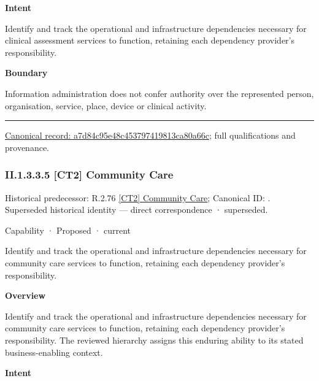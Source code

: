 \textbf{Intent}



Identify and track the operational and infrastructure dependencies necessary for clinical assessment services to function, retaining each dependency provider's responsibility.



\textbf{Boundary}



Information administration does not confer authority over the represented person, organisation, service, place, device or clinical activity.



\medskip\hrule\medskip

{\footnotesize \href{../../../../continuum/strategy/capability/a7d84c95e48c453797419813ca80a66c.md}{Canonical record: a7d84c95e48c453797419813ca80a66c}; full qualifications and provenance.}\par
\subsubsection*{II.1.3.3.5 [CT2] Community Care}
\label{navigation:II.1.3.3.5}

{\small Historical predecessor: R.2.76 \hyperref[element:4b7177f3f40449518fba381acae6ba1e]{[CT2] Community Care}; Canonical ID: \texttt{}. Superseded historical identity — direct correspondence · superseded.}\par
\label{element:942aa78cad004ef99de6b3aae8ddd014}
{\small Capability · Proposed · current}\par

Identify and track the operational and infrastructure dependencies necessary for community care services to function, retaining each dependency provider's responsibility.



\textbf{Overview}



Identify and track the operational and infrastructure dependencies necessary for community care services to function, retaining each dependency provider's responsibility. The reviewed hierarchy assigns this enduring ability to its stated business-enabling context.



\textbf{Intent}



